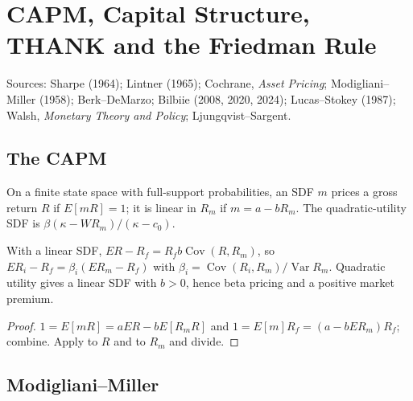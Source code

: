 \chapter{CAPM, Capital Structure, THANK and the Friedman Rule}
\label{chap:finance_policy}

Sources: Sharpe (1964); Lintner (1965); Cochrane, \emph{Asset Pricing}; Modigliani--Miller (1958); Berk--DeMarzo;
Bilbiie (2008, 2020, 2024); Lucas--Stokey (1987); Walsh, \emph{Monetary Theory and Policy}; Ljungqvist--Sargent.

\section{The CAPM}

\begin{definition}
\label{def:capm}
\leanok
On a finite state space with full-support probabilities, an SDF $m$ prices a gross return $R$ if $E[mR]=1$; it is linear in $R_m$
if $m=a-bR_m$. The quadratic-utility SDF is $\beta(\kappa-WR_m)/(\kappa-c_0)$.
\end{definition}

\begin{theorem}
\label{thm:capm}
\leanok
{}
With a linear SDF, $E R-R_f=R_fb\operatorname{Cov}(R,R_m)$, so $E R_i-R_f=\beta_i(E R_m-R_f)$ with
$\beta_i=\operatorname{Cov}(R_i,R_m)/\operatorname{Var}R_m$. Quadratic utility gives a linear SDF with $b>0$, hence beta pricing and a
positive market premium.
\end{theorem}
\begin{proof}
\leanok
$1=E[mR]=aER-bE[R_mR]$ and $1=E[m]R_f=(a-bER_m)R_f$; combine. Apply to $R$ and to $R_m$ and divide.
\end{proof}

\section{Modigliani--Miller}

